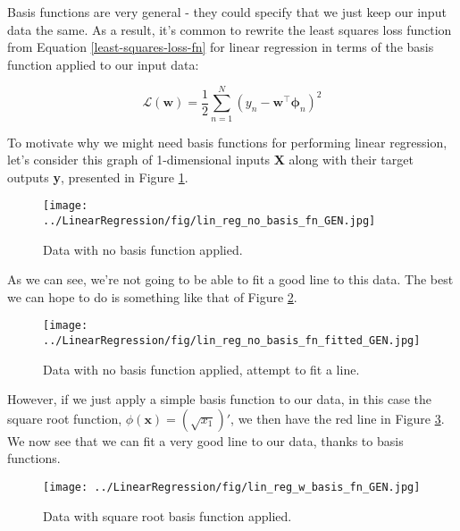 
Basis functions are very general - they could specify that we just keep our input data the same. As a result, it's common to rewrite the least squares loss function from Equation \ref{least-squares-loss-fn} for linear regression in terms of the basis function applied to our input data:

\begin{equation} \label{least-squares-loss-fn-w-basis}
    \mathcal{L}(\textbf{w}) = \frac{1}{2} \sum_{n=1}^{N} (y_{n} - \textbf{w}^\top\boldsymbol{\phi}_{n})^2
\end{equation}

To motivate why we might need basis functions for performing linear regression, let's consider this graph of 1-dimensional inputs \textbf{X} along with their target outputs \textbf{y}, presented in Figure \ref{fig:lin-reg-no-basis-fn}.

\begin{figure}
    \centering
    \texttt{[image: ../LinearRegression/fig/lin\_reg\_no\_basis\_fn\_GEN.jpg]}
    \caption{Data with no basis function applied.}
    \label{fig:lin-reg-no-basis-fn}
\end{figure}

As we can see, we're not going to be able to fit a good line to this data. The best we can hope to do is something like that of Figure \ref{fig:lin-reg-no-basis-fn-fitted}.

\begin{figure}
    \centering
    \texttt{[image: ../LinearRegression/fig/lin\_reg\_no\_basis\_fn\_fitted\_GEN.jpg]}
    \caption{Data with no basis function applied, attempt to fit a line.}
    \label{fig:lin-reg-no-basis-fn-fitted}
\end{figure}

However, if we just apply a simple basis function to our data, in this case the square root function, $\phi(\textbf{x}) = (\sqrt{x_{1}})'$, we then have the red line in Figure \ref{fig:lin-reg-w-basis-fn-fitted}. We now see that we can fit a very good line to our data, thanks to basis functions.

\begin{figure}
    \centering
    \texttt{[image: ../LinearRegression/fig/lin\_reg\_w\_basis\_fn\_GEN.jpg]}
    \caption{Data with square root basis function applied.}
    \label{fig:lin-reg-w-basis-fn-fitted}
\end{figure}


